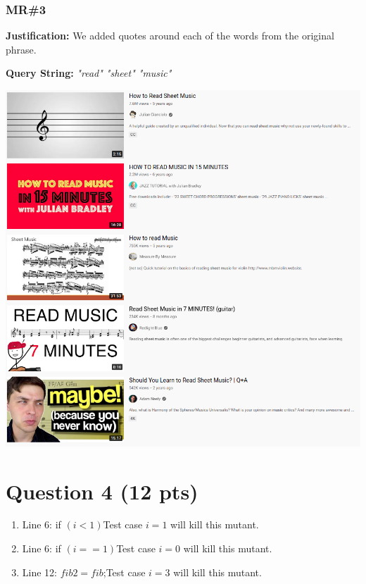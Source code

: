 \documentclass[12pt]{article}
\begin{document}
\newpage
\subsubsection*{MR\#3}

\noindent
\textbf{Justification:} We added quotes around each of the words from the original phrase.

\noindent
\textbf{Query String:} \textit{"read" "sheet" "music"}

\begin{center}
    \includegraphics[width=0.5\columnwidth]{q3-mr3.png}
\end{center}


\newpage
\section*{Question 4 (12 pts)}

\begin{enumerate}
    \item Line 6: if $(i < 1 )$\newline Test case $i = 1$ will kill this mutant.
    \item Line 6: if $( i == 1 )$\newline Test case $i = 0$ will kill this mutant.
    \item Line 12: $fib2 = fib$;\newline Test case $i = 3$ will kill this mutant.
\end{enumerate}
\end{document}

